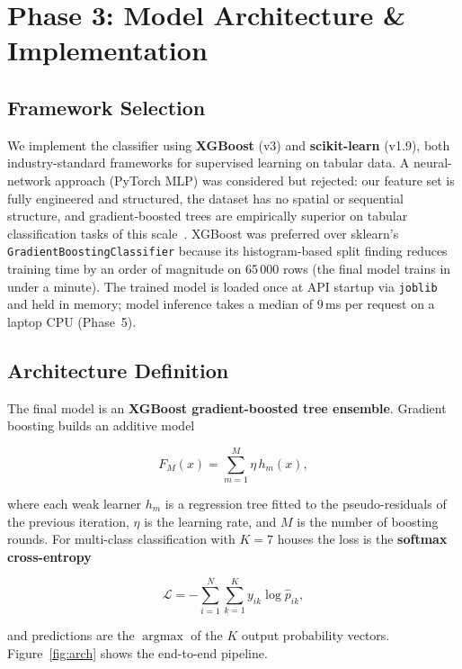 
\section{Phase 3: Model Architecture \& Implementation}

\subsection{Framework Selection}

We implement the classifier using \textbf{XGBoost} (v3) and
\textbf{scikit-learn} (v1.9), both industry-standard frameworks for
supervised learning on tabular data. A neural-network approach (PyTorch
MLP) was considered but rejected: our feature set is fully engineered and
structured, the dataset has no spatial or sequential structure, and
gradient-boosted trees are empirically superior on tabular classification
tasks of this scale~\cite{grinsztajn2022tree}. XGBoost was preferred over
sklearn's \texttt{GradientBoostingClassifier} because its histogram-based
split finding reduces training time by an order of magnitude on 65\,000
rows (the final model trains in under a minute). The trained model is loaded
once at API startup via \texttt{joblib} and held in memory; model inference
takes a median of 9\,ms per request on a laptop CPU (Phase~5).

\subsection{Architecture Definition}

The final model is an \textbf{XGBoost gradient-boosted tree ensemble}.
Gradient boosting builds an additive model

\[
  F_M(x) = \sum_{m=1}^{M} \eta \, h_m(x),
\]

where each weak learner $h_m$ is a regression tree fitted to the
pseudo-residuals of the previous iteration, $\eta$ is the learning rate,
and $M$ is the number of boosting rounds. For multi-class classification
with $K=7$ houses the loss is the \textbf{softmax cross-entropy}

\[
  \mathcal{L} = -\sum_{i=1}^{N}\sum_{k=1}^{K}
                y_{ik}\log\hat{p}_{ik},
\]

and predictions are the $\operatorname{argmax}$ of the $K$ output
probability vectors. Figure~\ref{fig:arch} shows the end-to-end pipeline.

